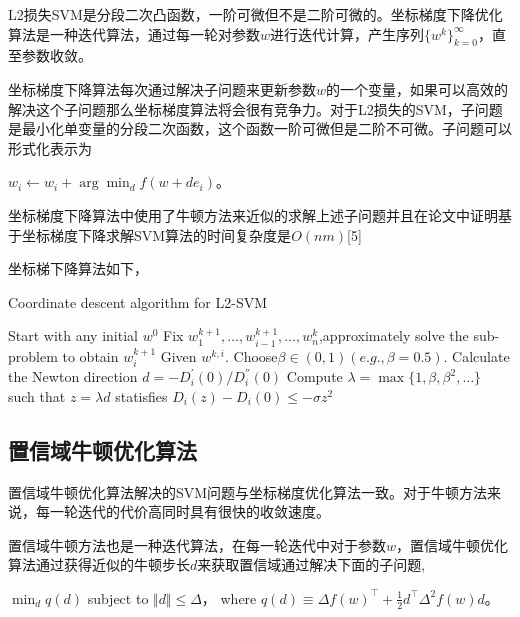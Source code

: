 \documentclass[master]{njuthesis}
\begin{document}
    L2损失SVM是分段二次凸函数，一阶可微但不是二阶可微的。坐标梯度下降优化算法是一种迭代算法，通过每一轮对参数$w$进行迭代计算，产生序列$\{w^k\}_{k=0}^{\infty}$，直至参数收敛。
    
    坐标梯度下降算法每次通过解决子问题来更新参数$w$的一个变量，如果可以高效的解决这个子问题那么坐标梯度算法将会很有竞争力。对于L2损失的SVM，子问题是最小化单变量的分段二次函数，这个函数一阶可微但是二阶不可微。子问题可以形式化表示为     

    $w_i \leftarrow w_i + \arg\min_{d} f\left(w+de_i\right)$。
    
    坐标梯度下降算法中使用了牛顿方法来近似的求解上述子问题并且在论文中证明基于坐标梯度下降求解SVM算法的时间复杂度是$O\left(nm\right)$[5]

    坐标梯下降算法如下，
    \begin{algorithm}
    \caption{Coordinate descent algorithm for L2-SVM}\label{CD}
    \begin{algorithmic}[1]
      \State Start with any initial $w^0$
	    \State Fix $w^{k+1}_{1},\dots,w^{k+1}_{i-1},\dots,w^{k}_{n}$,approximately solve the sub-problem to obtain $w^{k+1}_{i}$
	      \State Given $w^{k,i}$. Choose$\beta \in \left(0,1\right) \left(e.g.,\beta=0.5\right)$.
	      \State Calculate the Newton direction $d=-D^{'}_{i}\left(0\right)/D^{''}_{i}\left(0\right)$
	      \State Compute $\lambda = \max\{1,\beta,\beta^2,\dots\}$ such that $z = \lambda d$ statisfies $D_{i}\left(z\right) - D_{i}\left(0\right) \le -\sigma z^2$
          \EndProcedure
        \EndFor
      \EndFor
    \EndProcedure
    \end{algorithmic}
    \end{algorithm}

    
\subsection{置信域牛顿优化算法}
   
    
    置信域牛顿优化算法解决的SVM问题与坐标梯度优化算法一致。对于牛顿方法来说，每一轮迭代的代价高同时具有很快的收敛速度。

    置信域牛顿方法也是一种迭代算法，在每一轮迭代中对于参数$w$，置信域牛顿优化算法通过获得近似的牛顿步长$d$来获取置信域通过解决下面的子问题,

    $\min_{d} q\left(d\right)$ subject to $\Vert d \Vert \le \Delta$， where $q\left(d\right) \equiv \Delta f\left(w\right)^\intercal+\frac{1}{2} d^\intercal \Delta^2 f\left(w\right)d$。
    
\end{document}
